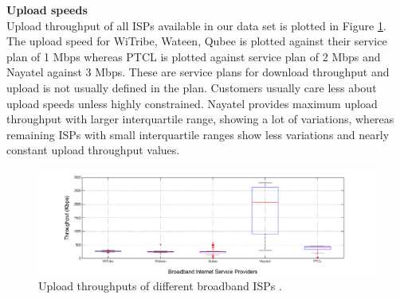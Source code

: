 \documentclass{sig-alternate-10pt}
\begin{document}
\textbf{Upload speeds}\\
\indent Upload throughput of all ISPs available in our data set is plotted in Figure \ref{Fig:7}. The upload speed for WiTribe, Wateen, Qubee is plotted against their service plan of 1 Mbps whereas PTCL is plotted against service plan of 2 Mbps and Nayatel against 3 Mbps. These are service plans for download throughput and upload is not usually defined in the plan. Customers usually care less about upload speeds unless highly constrained. Nayatel provides maximum upload throughput with larger interquartile range, showing a lot of variations, whereas remaining ISPs with small interquartile ranges show less variations and nearly constant upload throughput values.

\begin{figure}[h!]
\begin {center}
   \includegraphics[height=0.2 \textheight,width=0.5 \textwidth]{7.png}
   \end {center}
 \caption{Upload throughputs of different broadband ISPs .} \label{Fig:7}
\end{figure}
\end{document}
